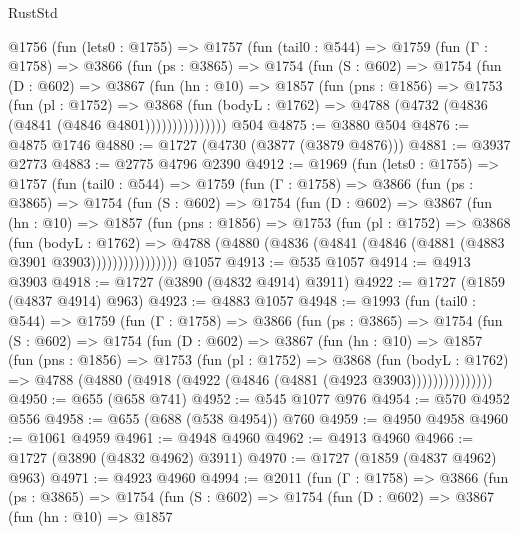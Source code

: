 \begin{lexlean}{RustStd}
\begin{coremodule}
    @1756
      (fun (lets0 : @1755) =>
      @1757
        (fun (tail0 : @544) =>
        @1759
          (fun (Γ : @1758) =>
          @3866
            (fun (ps : @3865) =>
            @1754
              (fun (S : @602) =>
              @1754
                (fun (D : @602) =>
                @3867
                  (fun (hn : @10) =>
                  @1857
                    (fun (pns : @1856) =>
                    @1753
                      (fun (pl : @1752) =>
                      @3868
                        (fun (bodyL : @1762) =>
                        @4788 (@4732 (@4836 (@4841 (@4846 @4801)))))))))))))))
    @504
@4875 := @3880 @504
@4876 := @4875 @1746
@4880 := @1727 (@4730 (@3877 (@3879 @4876)))
@4881 := @3937 @2773
@4883 := @2775 @4796 @2390
@4912 := @1969
    (fun (lets0 : @1755) =>
    @1757
      (fun (tail0 : @544) =>
      @1759
        (fun (Γ : @1758) =>
        @3866
          (fun (ps : @3865) =>
          @1754
            (fun (S : @602) =>
            @1754
              (fun (D : @602) =>
              @3867
                (fun (hn : @10) =>
                @1857
                  (fun (pns : @1856) =>
                  @1753
                    (fun (pl : @1752) =>
                    @3868
                      (fun (bodyL : @1762) =>
                      @4788 (@4880 (@4836 (@4841 (@4846 (@4881 (@4883 @3901 @3903))))))))))))))))
    @1057
@4913 := @535 @1057
@4914 := @4913 @3903
@4918 := @1727 (@3890 (@4832 @4914) @3911)
@4922 := @1727 (@1859 (@4837 @4914) @963)
@4923 := @4883 @1057
@4948 := @1993
    (fun (tail0 : @544) =>
    @1759
      (fun (Γ : @1758) =>
      @3866
        (fun (ps : @3865) =>
        @1754
          (fun (S : @602) =>
          @1754
            (fun (D : @602) =>
            @3867
              (fun (hn : @10) =>
              @1857
                (fun (pns : @1856) =>
                @1753
                  (fun (pl : @1752) =>
                  @3868
                    (fun (bodyL : @1762) =>
                    @4788 (@4880 (@4918 (@4922 (@4846 (@4881 (@4923 @3903)))))))))))))))
@4950 := @655 (@658 @741)
@4952 := @545 @1077 @976
@4954 := @570 @4952 @556
@4958 := @655 (@688 (@538 @4954)) @760
@4959 := @4950 @4958
@4960 := @1061 @4959
@4961 := @4948 @4960
@4962 := @4913 @4960
@4966 := @1727 (@3890 (@4832 @4962) @3911)
@4970 := @1727 (@1859 (@4837 @4962) @963)
@4971 := @4923 @4960
@4994 := @2011
    (fun (Γ : @1758) =>
    @3866
      (fun (ps : @3865) =>
      @1754
        (fun (S : @602) =>
        @1754
          (fun (D : @602) =>
          @3867
            (fun (hn : @10) =>
            @1857

\end{coremodule}
\end{lexlean}
